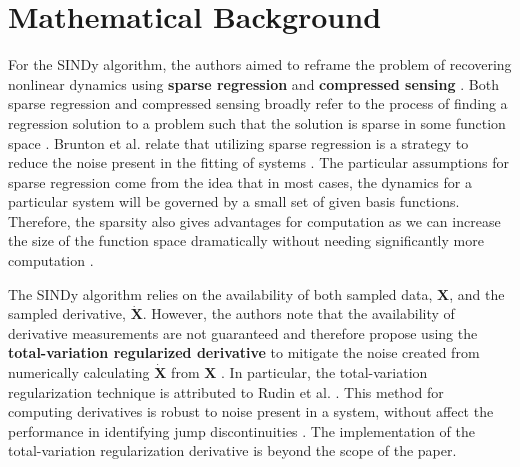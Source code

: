 \documentclass[10pt]{paper}
\begin{document}

\section{Mathematical Background} \label{sec:mathematical_background}
For the SINDy algorithm, the authors aimed to reframe the problem of recovering nonlinear dynamics using \textbf{sparse regression} and \textbf{compressed sensing} \cite{sindy}. Both sparse regression and compressed sensing broadly refer to the process of finding a regression solution to a problem such that the solution is sparse in some function space \cite{sindy}. 
Brunton et al. relate that utilizing sparse regression is a strategy to reduce the noise present in the fitting of systems \cite{sindy}. The particular assumptions for sparse regression come from the idea that in most cases, the dynamics for a particular system will be governed by a small set of given basis functions. Therefore, the sparsity also gives advantages for computation as we can increase the size of the function space dramatically without needing significantly more computation \cite{sindy}. 


The SINDy algorithm relies on the availability of both sampled data, $\mathbf X$, and the sampled derivative, $\mathbf{\dot X}$. However, the authors note that the availability of derivative measurements are not guaranteed and therefore propose using the \textbf{total-variation regularized derivative} to mitigate the noise created from numerically calculating $\mathbf {\dot X}$ from $\mathbf X$ \cite{sindy}. 
In particular, the total-variation regularization technique is attributed to Rudin et al. \cite{rudin}. This method for computing derivatives is robust to noise present in a system, without affect the performance in identifying jump discontinuities \cite{chartrand2011numerical}. 
The implementation of the total-variation regularization derivative is beyond the scope of the paper. 
\end{document}
